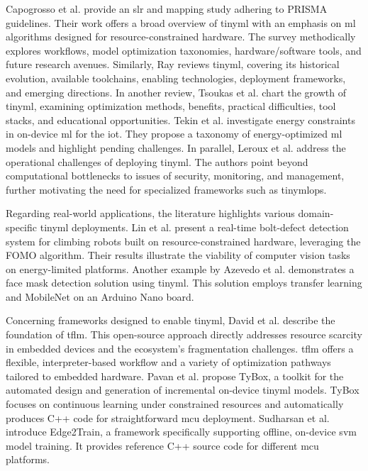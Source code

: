 Capogrosso et al. \cite{capogrossoMachineLearningOrientedSurvey2024} provide an \gls{slr} and mapping study adhering to PRISMA guidelines. Their work offers a broad overview of \gls{tinyml} with an emphasis on \gls{ml} algorithms designed for resource-constrained hardware. The survey methodically explores workflows, model optimization taxonomies, hardware/software tools, and future research avenues. Similarly, Ray \cite{rayReviewTinyMLStateoftheart2022} reviews \gls{tinyml}, covering its historical evolution, available toolchains, enabling technologies, deployment frameworks, and emerging directions. In another review, Tsoukas et al. \cite{tsoukasReviewEmergingTechnology2024} chart the growth of \gls{tinyml}, examining optimization methods, benefits, practical difficulties, tool stacks, and educational opportunities. Tekin et al. \cite{tekinReviewOndeviceMachine2024} investigate energy constraints in on-device \gls{ml} for the \gls{iot}. They propose a taxonomy of energy-optimized \gls{ml} models and highlight pending challenges. In parallel, Leroux et al. \cite{lerouxTinyMLOpsOperationalChallenges2022a} address the operational challenges of deploying \gls{tinyml}. The authors point beyond computational bottlenecks to issues of security, monitoring, and management, further motivating the need for specialized frameworks such as \gls{tinymlops}.

Regarding real-world applications, the literature highlights various domain-specific \gls{tinyml} deployments. Lin et al. \cite{linTinyMachineLearning2024} present a real-time bolt-defect detection system for climbing robots built on resource-constrained hardware, leveraging the FOMO algorithm. Their results illustrate the viability of computer vision tasks on energy-limited platforms. Another example by Azevedo et al. \cite{azevedoDetectingFaceMasks2023a} demonstrates a face mask detection solution using \gls{tinyml}. This solution employs transfer learning and MobileNet on an Arduino Nano board.

Concerning frameworks designed to enable \gls{tinyml}, David et al. \cite{davidTensorFlowLiteMicro2021} describe the foundation of \gls{tflm}. This open-source approach directly addresses resource scarcity in embedded devices and the ecosystem's fragmentation challenges. \gls{tflm} offers a flexible, interpreter-based workflow and a variety of optimization pathways tailored to embedded hardware. Pavan et al. \cite{pavanTyBoxAutomaticDesign2024} propose TyBox, a toolkit for the automated design and generation of incremental on-device \gls{tinyml} models. TyBox focuses on continuous learning under constrained resources and automatically produces C++ code for straightforward \gls{mcu} deployment. Sudharsan et al. \cite{sudharsanEdge2TrainFrameworkTrain2020} introduce Edge2Train, a framework specifically supporting offline, on-device \gls{svm} model training. It provides reference C++ source code for different \gls{mcu} platforms.

